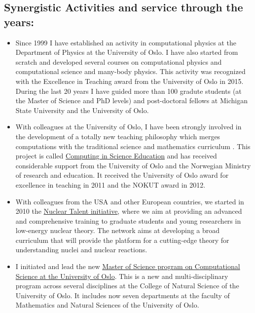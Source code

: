 \documentclass[%
oneside,                 %
final,                   %
10pt]{article}
\begin{document}
\noindent
\subsection*{Synergistic Activities and service through the years:}

\begin{itemize}
\item Since 1999 I have   established an activity in computational physics  at the  Department of Physics at the University of Oslo. I have also started from scratch and developed several  courses on computational physics and computational science and many-body physics. This activity was recognized with the Excellence in Teaching award from the University of Oslo in 2015. During the last 20 years I have guided  more than 100 gradute students (at the Master of Science and PhD levels) and post-doctoral fellows at Michigan State University and the University of Oslo.

\item With colleagues at the University of Oslo, I have   been strongly involved in the development of a totally new teaching philosophy which merges computations with the traditional science and mathematics curriculum . This project is called \href{{http://www.mn.uio.no/english/about/collaboration/cse/}}{Computing in Science Education} and has received considerable support from the University of Oslo and the Norwegian Ministry of research and education.  It received the University of Oslo award for excellence in teaching  in 2011 and the NOKUT award in 2012. 

\item With colleagues from the USA and other European countries, we started in 2010 the \href{{http://www.nucleartalent.org}}{Nuclear Talent initiative},  where we aim  at providing an advanced and comprehensive training to graduate students and young researchers in low-energy nuclear theory.  The network aims at developing a broad curriculum that will provide the platform for a cutting-edge theory for understanding nuclei and nuclear reactions.  

\item I initiated and lead the new \href{{http://www.uio.no/english/studies/programmes/computational-science-master/}}{Master of Science program on Computational Science at the University of Oslo}. This is a new and multi-disciplinary program across several disciplines at the College of Natural Science of the University of Oslo. It includes now seven  departments at the faculty of Mathematics and Natural Sciences of  the University of Oslo.
\end{itemize}
\end{document}
